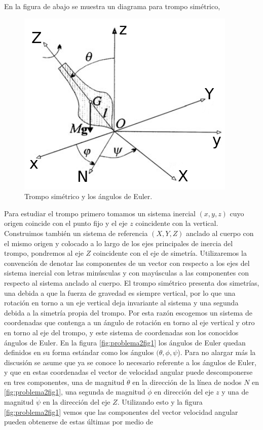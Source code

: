 \documentclass[a4paper,10pt]{article}
\numberwithin{equation}{section}
\begin{document}
En la figura de abajo se muestra un diagrama para trompo simétrico, 

\begin{figure}[H]
 \center 
 \includegraphics[scale=0.5]{problema2fig1}
 \caption{Trompo simétrico y los ángulos de Euler.}
 \label{fig:problema2fig1}
\end{figure}

Para estudiar el trompo primero tomamos un sistema inercial $(x,y,z)$ cuyo origen 
coincide con el punto fijo y el eje $z$ coincidente con la vertical. Construimos también 
un sistema de referencia $(X,Y,Z)$ anclado al cuerpo con el mismo origen y colocado 
a lo largo de los ejes principales de inercia del trompo, pondremos al eje $Z$ coincidente 
con el eje de simetría. Utilizaremos la convención de denotar las componentes de un 
vector con respecto a los ejes del sistema inercial con letras minúsculas 
y con mayúsculas a las componentes con respecto al sistema anclado al cuerpo. El trompo 
simétrico presenta dos simetrías, una debida a que la fuerza de gravedad 
es siempre vertical, por lo que una rotación en torno a un eje vertical deja invariante 
al sistema y una segunda debida a la simetría propia del trompo. Por esta razón escogemos 
un sistema de coordenadas que contenga a un ángulo de rotación en torno al eje vertical 
y otro en torno al eje del trompo, y este sistema de coordenadas son los conocidos 
ángulos de Euler. En la figura \eqref{fig:problema2fig1} los ángulos de Euler quedan 
definidos en su forma estándar como los ángulos $(\theta,\phi,\psi$). Para no alargar 
más la discusión se asume que ya se conoce lo necesario referente a los ángulos 
de Euler, y que en estas coordenadas el vector de velocidad angular puede descomponerse 
en tres componentes, una de magnitud $\dot{\theta}$ en la dirección de la línea de 
nodos $N$ en \eqref{fig:problema2fig1}, una segunda de magnitud $\dot{\phi}$ en
dirección del eje $z$ y una de magnitud $\dot{\psi}$ en la dirección del eje $Z$. Utilizando 
esto y la figura \eqref{fig:problema2fig1} vemos que las componentes del vector 
velocidad angular pueden obtenerse de estas últimas por medio de 
\end{document}
